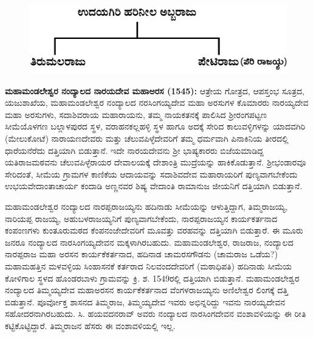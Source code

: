 \begin{figure}[H]
\includegraphics[scale=1]{images/chap3/chap3fig40.jpeg}
\end{figure}

\newpage

\textbf{ಮಹಾಮಂಡಲೇಶ್ವರ ನಂದ್ಯಾಲದ ನಾರಯದೇವ ಮಹಾಅರಸ (1545):} ಆತ್ರೇಯ ಗೋತ್ರದ, ಆಪಸ್ತಂಭ ಸೂತ್ರದ, ಯಜುಶಾಖೆಯ, ಮಹಾಮಂಡಲೇಶ್ವರ ನಂದ್ಯಾಲದ ನರಸಿಂಗಯ್ಯದೇವ ಮಹಾ ಅರಸುಗಳ ಕೊಮಾರರು ನಾರಯ್ಯದೇವ ಮಹಾ ಅರಸುಗಳು, ಸದಾಶಿವರಾಯ ಮಹಾರಾಯನು, ತಮ್ಮ ನಾಯಕತನಕ್ಕೆ ಪಾಲಿಸಿದ ಶ‍್ರೀರಂಗಪಟ್ಟಣ ಸೀಮೆಯೊಳಗಣ ಬಲ್ಲಾಳಪುರದ ಸ್ಥಳ, ವರಾಹನಕಲ್ಲಹಳ್ಳಿ ಸ್ಥಳ ಹಾಗೂ ಅದಕ್ಕೆ ಸೇರಿದ ಕಾಲುವಳ್ಳಿಗಳನ್ನು ಯಾದವಗಿರಿ (ಮೇಲುಕೋಟೆ) ನಾರಾಯಣದೇವರು ಮತ್ತು ಚೆಲುವಪಿಳ್ಳೆದೇವರಿಗೆ ತಮ್ಮ ಧರ್ಮವಾಗಿ ಪಿನಾಕಿನಿಯ ತೀರದಲ್ಲಿ ಧಾರೆಯನೆರೆದು ದತ್ತಿಯಾಗಿ ಬಿಡುತ್ತಾನೆ. ಇದೇ ನಾರಯದೇವನು ಶ‍್ರೀ ಭಾಷ್ಯಕಾರರು ಬಿಜೆಯಮಾಡಿದ್ದ ಯತಿರಾಜಮಠವನು ಚೆಲುವಪಿಳ್ಳೆರಾಯರ ದೇವಾಲಯಕ್ಕೆ ದೇಶಾಂತ್ರಿ ಮುದ್ರೆಯನ್ನು ಹಾಕಿಕೊಡುತ್ತಾನೆ. ಶ‍್ರೀಭಂಡಾರವೂ ಸೇರಿದಂತೆ, ಸೀಮೆಯ ಗ್ರಾಮಗಳ ಕಾಣಿಕೆಯ ಆದಾಯವನ್ನು ಸದಾಶಿವದೇವ ಮಹಾರಾಯರಿಗೆ ಪುಣ್ಯವಾಗಬೇಕೆಂದು ಉಭಯವೇದಾಂತಾಚಾರ್ಯ ಕಂದಾಡಿ ಅಣ್ಣನವರ ಶಿಷ್ಯ ವೇದಾಂತಿ ರಾಮಾನುಜ ಜೀಯನಿಗೆ ದತ್ತಿಯಾಗಿ ಬಿಡುತ್ತಾನೆ.

ಮಹಾಮಂಡಲೇಶ್ವರ ನಂದ್ಯಾಲದ ನಾರಪ್ಪರಾಜಯ್ಯನು ಹದಿನಾಡು ಸೀಮೆಯನ್ನು ಆಳುತ್ತಿದ್ದಾಗ, ತಿಮ್ಮರಾಜಯ್ಯ, ನಾರಿಯಪ್ಪ ರಾಜಯ್ಯ, ಅಹುಬಳರಾಜಯ್ಯನಿಗೆ ಪುಣ್ಯವಾಗಬೇಕೆಂದು, ನಾರಪ್ಪರಾಜಯ್ಯನ ಕಾರ್ಯಕರ್ತನಾದ ಕಂಪಂಣಗಳು ಕುಂತೂರುಮಠದ ಕೆಂಪನಂಜೇದೇವರಿಗೆ ಮೂವತ್ತು ವರಹವನ್ನು ದತ್ತಿಯಾಗಿ ಬಿಡುತ್ತಾರೆ. ಈ ಮೂರು ಜನರೂ ನಂದ್ಯಾಲದ ನಾರಸಿಂಗಯ್ಯದೇವನ ಮಕ್ಕಳಾಗಿರಬಹುದು. ಮಹಾಮಂಡಲೇಶ್ವರ, ರಾಜರಾಜ, ನಂದ್ಯಾಲದ ನಾರಪ್ಪರಾಜ ಮಹಾ ಅರಸನ ಕಾರ್ಯಕೆಕರ್ತನಾದ, ಹದಿನಾಡ ಚಾಮರಸಗೌಡನು (ಚಾಮರಾಜ ಒಡೆಯ?) ಮಹಾಮಹತ್ತಿನ ಮಳವಳ್ಳಿಯ ಸಿಂಹಾಸನಕೆ ಕರ್ತರಾದ ನಿಲವಂದದೇವರಿಗೆ (ಮಠಾಧಿಪತಿ) ಹದಿನಾಡು ಸೀಮೆಯ ಕೋಳಿಗಾಲ ಸ್ಥಳದ ಹೊಂಡರಬಾಳು ಗ್ರಾಮವನ್ನು ಕ್ರಿ. ಶ. 1549ರಲ್ಲಿ ದತ್ತಿಯಾಗಿ ಬಿಡುತ್ತಾನೆ. ಮಹಾಮಂಡಲೇಶ್ವರ ನಂದ್ಯಾಲದ ತಿಮ್ಮಯ್ಯದೇವ ಮಹಾಅರಸನ ಕಾರ್ಯಕೆಕರ್ತನಾದ ವೆಂಗಳರಾಜಯ್ಯನು ಅಣಿಲೇಶ್ವರ ಲಿಂಗಕ್ಕೆ ದತ್ತಿ ಬಿಡುತ್ತಾನೆ. ಪೂರ್ವೋಕ್ತ ಶಾಸನದ ತಿಮ್ಮರಾಜ, ತಿಮ್ಮಯ್ಯದೇವ ಇವರು ಅಭಿನ್ನರಿದ್ದು ಇವನು ನಾರಯ್ಯದೇವನ ಸಹೋದರನಾಗಿರಬಹುದು. ಸಿ. ಹಯವದನರಾವ್​ ಅವರು ನಂದ್ಯಾಲದ ನಾರಸಿಂಗದೇವನ ವಂಶಾವಳಿಯನ್ನು ಈ ರೀತಿ ಕಟ್ಟಿಕೊಟ್ಟಿದ್ದಾರೆ. ತಿಮ್ಮರಾಜನ ಹೆಸರು ಈ ವಂಶಾವಳಿಯಲ್ಲಿ ಇಲ್ಲ.

